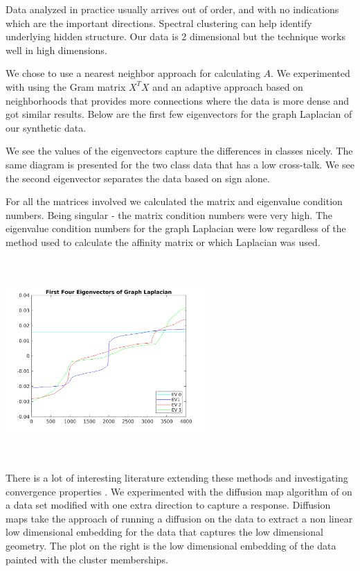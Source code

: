 Data analyzed in practice usually arrives out of order, and with no indications which are the important directions. Spectral clustering can help identify underlying hidden structure.  Our data is 2 dimensional but the technique works well in high dimensions.  

We chose to use a nearest neighbor approach for calculating $A$. We experimented with using the Gram matrix $X^T X$ and an adaptive approach based on neighborhoods that provides more connections where the data is more dense and got similar results. Below are the first few eigenvectors for the graph Laplacian of our synthetic data.  

We see the values of the eigenvectors capture the differences in classes nicely. The same diagram is presented for the two class data that has a low cross-talk. We see the second eigenvector separates the data based on sign alone. 

For all the matrices involved we calculated the matrix and eigenvalue condition numbers. Being singular - the matrix condition numbers were very high. The eigenvalue condition numbers for the graph Laplacian were low regardless of the method used to calculate the affinity matrix or which Laplacian was used.  

\includegraphics[width=3in,height=3in]{images/eigenvecs.png}

There is a lot of interesting literature extending these methods and investigating convergence properties \cite{alee_wasserman} \cite{BELKIN20081289}. We experimented with the diffusion map algorithm of \cite{coifman2005geometric} on a data set modified with one extra direction to capture a response. Diffusion maps take the approach of running a diffusion on the data to extract a non linear low dimensional embedding for the data that captures the low dimensional geometry. The plot on the right is the low dimensional embedding of the data painted with the cluster memberships. 

